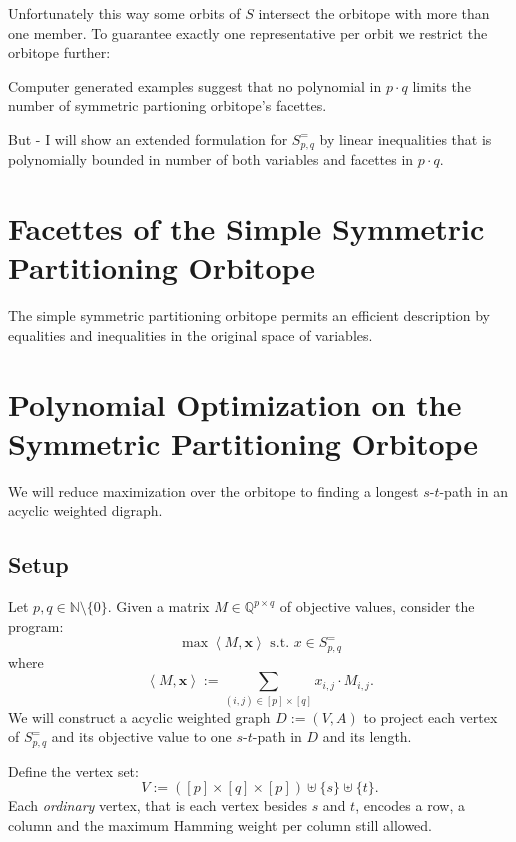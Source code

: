 \documentclass[a4paper]{amsart}
\theoremstyle{definition}
\begin{document}

Unfortunately this way some orbits of $S$ intersect the orbitope with
more than one member.  To guarantee exactly one representative per
orbit we restrict the orbitope further:


Computer generated examples suggest that no polynomial in \(p \cdot
q\) limits the number of  symmetric partioning orbitope's
facettes.

But - I will show an extended formulation for \(S^=_{p, q}\) by linear
inequalities that is polynomially bounded in number of both variables
and facettes in \(p \cdot q\).


\section{Facettes of the Simple Symmetric Partitioning Orbitope}

The simple symmetric partitioning orbitope permits an efficient
description by equalities and inequalities in the original space of
variables.



\section{Polynomial Optimization on the  Symmetric Partitioning
  Orbitope}
\label{fluss}
We will reduce maximization over the orbitope to finding a longest
\(s\)-\(t\)-path in an acyclic weighted digraph.

\subsection{Setup}

Let \(p, q \in \mathbb{N} \setminus \{0\}\).  Given a matrix \(M \in
\mathbb{Q}^{p \times q}\) of objective values, consider the program:
\begin{equation}
\label{optS}
\max \left<M, \mathbf{x} \right>  \text{ s.t. } x \in S^=_{p, q}
\end{equation}
where \[\left<M, \mathbf{x} \right> := \sum_{(i, j)\in [p]\times [q]} x_{i, j}\cdot M_{i, j}\text{.}\]
We will construct a acyclic weighted graph \(D := (V, A)\) to project each vertex of
\(S^=_{p, q}\) and its objective value to one \(s\)-\(t\)-path in \(D\) and its length.

Define the vertex set:
\[V := \left( [p]\times [q] \times [p]\right) \uplus \{s\} \uplus \{t\}\text{.}\] 
Each \textit{ordinary} vertex, that is
each vertex besides \(s\) and \(t\), encodes a row, a column and the
maximum Hamming weight per column still allowed.
\end{document}
